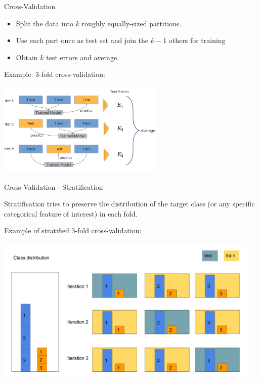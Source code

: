 \documentclass[11pt,compress,t,notes=noshow, xcolor=table]{beamer}
\newenvironment{knitrout}{}{} %
\begin{document}
\begin{vbframe}{Cross-Validation}

\begin{itemize}
  \item Split the data into $k$ roughly equally-sized partitions.
  \item Use each part once as test set and join the $k-1$ others for training
  \item Obtain $k$ test errors and average.
\end{itemize}

\lz

Example: 3-fold cross-validation:

\begin{center}
\includegraphics[width=8cm]{figure_man/crossvalidation.png}
\end{center}
\end{vbframe}

\begin{vbframe}{Cross-Validation - Stratification}

Stratification tries to preserve the distribution of the target class (or any specific categorical feature of interest) in each fold.

\lz

Example of stratified 3-fold cross-validation:

\lz

\begin{knitrout}\scriptsize
{}\color{fgcolor}

{\centering \includegraphics[width=0.95\textwidth]{figure/eval_resample_1} 

}



\end{knitrout}
\end{vbframe}
\end{document}
